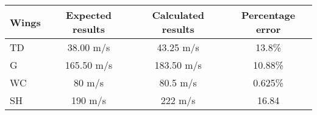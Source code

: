 \documentclass{standalone}
\begin{document}
    \centering
    \begin{tabular}{l c c c}
    \toprule
    \toprule
    Wings&Expected results&Calculated results&Percentage error\\
    \midrule
    TD & 38.00 m/s & 43.25 m/s & 13.8\% \\
    G & 165.50 m/s & 183.50 m/s & 10.88\% \\
    WC & 80 m/s & 80.5 m/s & 0.625\% \\
    SH & 190 m/s & 222 m/s & 16.84\\
    \bottomrule
    \bottomrule
    \end{tabular}
    
\end{document}
